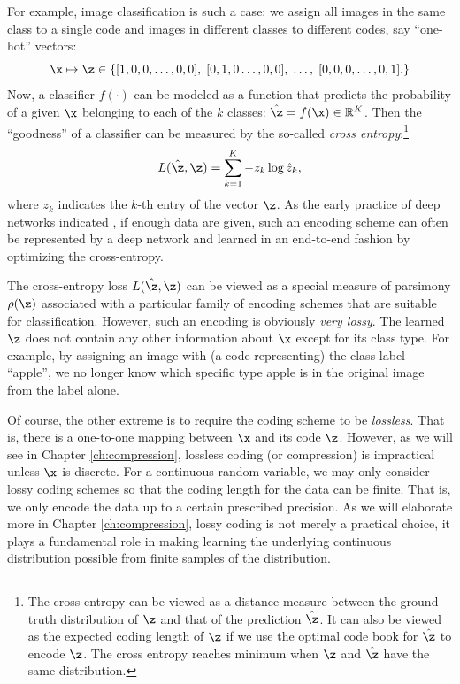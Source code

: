 \documentclass[../../book-main.tex]{subfiles}
\begin{document}
\begin{example}
For example, image classification is such a case: we assign all images in the same class to a single code and images in different classes to different codes, say ``one-hot'' vectors:
\begin{equation}
  \x \mapsto \z \in \{  [1, 0, 0, \ldots , 0, 0], \;  [0, 1, 0 \ldots, 0, 0], \; \ldots, \;  [0,0,0, \ldots, 0, 1].\}
  \label{eqn:class-labels}
\end{equation}
Now, a classifier $f(\cdot)$ can be modeled as a function that predicts the probability of a given $\x$ belonging to each of the $k$ classes: $\hat{\z} = f(\x) \in \mathbb{R}^K$. Then the ``goodness'' of a classifier can be measured by the so-called {\em cross entropy}:\footnote{The cross entropy can be viewed as a distance measure between the ground truth distribution of $\z$ and that of the prediction $\hat\z$. It can also be viewed as the expected coding length of $\z$ if we use the optimal code book for $\hat \z$ to encode $\z$. The cross entropy reaches minimum when $\z$ and $\hat \z$ have the same distribution.}
\begin{equation}
    L(\hat{\z}, \z) = \sum_{k=1}^K - z_k \log \hat{z}_k,
\end{equation}
where $z_k$ indicates the $k$-th entry of the vector $\z$. As the early practice of deep networks indicated \cite{krizhevsky2012imagenet}, if enough data are given, such an encoding scheme can often be represented by a deep network and learned in an end-to-end fashion by optimizing the cross-entropy. 
\end{example}

The cross-entropy loss $L(\hat \z, \z)$ can be viewed as a special measure of parsimony $\rho(\z)$ associated with a particular family of encoding schemes that are suitable for classification. However, such an encoding is obviously {\em very lossy}. The learned $\z$ does not contain any other information about $\x$ except for its class type. For example, by assigning an image with (a code representing) the class label ``apple'', we no longer know which specific type apple is in the original image from the label alone. 

Of course, the other extreme is to require the coding scheme to be {\em lossless}. That is, there is a one-to-one mapping between $\x$ and its code $\z$. However, as we will see in Chapter \ref{ch:compression},  lossless coding (or compression) is impractical unless $\x$ is discrete. For a continuous random variable, we may only consider lossy coding schemes so that the coding length for the data can be finite. That is, we only encode the data up to a certain prescribed precision. As we will elaborate more in Chapter \ref{ch:compression}, lossy coding is not merely a practical choice, it plays a fundamental role in making learning the underlying continuous distribution possible from finite samples of the distribution. 
\end{document}
